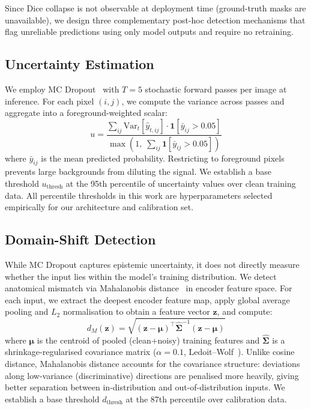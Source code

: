 \documentclass[a4paper,conference]{IEEEtran}
\begin{document}
Since Dice collapse is not observable at deployment time (ground-truth masks are unavailable), we design three complementary post-hoc detection mechanisms that flag unreliable predictions using only model outputs and require no retraining.

\subsection{Uncertainty Estimation}

We employ MC Dropout~\cite{b6,b8,b9} with $T{=}5$ stochastic forward passes per image at inference. For each pixel $(i,j)$, we compute the variance across passes and aggregate into a foreground-weighted scalar:
\begin{equation}
u = \frac{\sum_{ij} \text{Var}_t[\hat{y}_{t,ij}] \cdot \mathbf{1}[\bar{y}_{ij} > 0.05]}{\max(1,\; \sum_{ij} \mathbf{1}[\bar{y}_{ij} > 0.05])}
\label{eq:uncertainty}
\end{equation}
where $\bar{y}_{ij}$ is the mean predicted probability. Restricting to foreground pixels prevents large backgrounds from diluting the signal. We establish a base threshold $u_{\text{thresh}}$ at the 95th percentile of uncertainty values over clean training data. All percentile thresholds in this work are hyperparameters selected empirically for our architecture and calibration set.

\subsection{Domain-Shift Detection}

While MC Dropout captures epistemic uncertainty, it does not directly measure whether the input lies within the model's training distribution. We detect anatomical mismatch via Mahalanobis distance~\cite{b7,b10} in encoder feature space. For each input, we extract the deepest encoder feature map, apply global average pooling and $L_2$ normalisation to obtain a feature vector $\mathbf{z}$, and compute:
\begin{equation}
d_M(\mathbf{z}) = \sqrt{(\mathbf{z} - \boldsymbol{\mu})^\top \hat{\boldsymbol{\Sigma}}^{-1} (\mathbf{z} - \boldsymbol{\mu})}
\label{eq:mahal}
\end{equation}
where $\boldsymbol{\mu}$ is the centroid of pooled (clean+noisy) training features and $\hat{\boldsymbol{\Sigma}}$ is a shrinkage-regularised covariance matrix ($\alpha{=}0.1$, Ledoit--Wolf~\cite{b11}). Unlike cosine distance, Mahalanobis distance accounts for the covariance structure: deviations along low-variance (discriminative) directions are penalised more heavily, giving better separation between in-distribution and out-of-distribution inputs. We establish a base threshold $d_{\text{thresh}}$ at the 87th percentile over calibration data.
\end{document}
